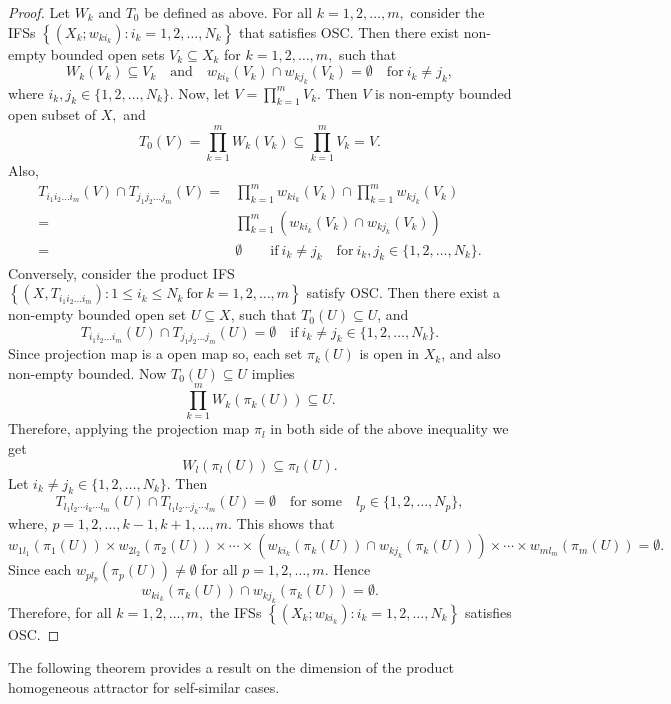 \documentclass[10pt]{amsart}
\theoremstyle{definition}
\begin{document}
	\begin{proof}
		Let $W_k$ and $T_0$  be defined as above. For all $k=1,2,\ldots,m,$ consider the IFSs $\left\{(X_k;w_{ki_k}):i_k=1,2,\ldots,N_k\right\}$ that satisfies OSC. Then there exist non-empty bounded open sets $V_k\subseteq X_k$ for $k=1,2,\ldots,m,$ such that $$W_k(V_k)\subseteq V_k\quad\mbox{and}\quad w_{ki_k}(V_k)\cap w_{kj_k}(V_k)=\emptyset\quad\mbox{for}~i_k\neq j_k,$$
		where $i_k,j_k\in\{1,2,\ldots,N_k\}.$ Now, let $V=\prod_{k=1}^{m}V_k.$ Then $V$ is non-empty bounded open subset of $X,$ and $$
		T_0(V)=\prod_{k=1}^mW_k(V_k)\subseteq\prod_{k=1}^mV_k=V.$$
		Also,
		\begin{align*}
			T_{i_1i_2\ldots i_m}(V)\cap T_{j_1j_2\ldots j_m}(V)=&\prod_{k=1}^mw_{ki_k}(V_k)\cap \prod_{k=1}^mw_{kj_k}(V_k)\\
			=&\prod_{k=1}^m\left(w_{ki_k}(V_k)\cap w_{kj_k}(V_k)\right)\\
			=&\emptyset \qquad \mbox{if}~i_k\neq j_k\quad\mbox{for}~i_k,j_k\in\{1,2,\ldots,N_k\}.
		\end{align*}
		Conversely, consider the product IFS $\left\{(X,T_{i_1i_2\ldots i_m}):1\leq i_k\leq N_k~\mbox{for}~k=1,2,\ldots,m\right\}$ satisfy OSC. Then there exist a non-empty bounded open set $U\subseteq X$, such that $T_0(U)\subseteq U$, and $$T_{i_1i_2\ldots i_m}(U)\cap T_{j_1j_2\ldots j_m}(U)=\emptyset\quad \mbox{if}~i_k\neq j_k\in\{1,2,\ldots,N_k\}. $$ Since projection map is a open map so, each set $\pi_k(U)$ is open in $X_k$, and also non-empty bounded. Now $T_0(U)\subseteq U$ implies
		$$\prod_{k=1}^mW_k(\pi_k(U))\subseteq U.$$
		Therefore, applying the projection map $\pi_l$ in both side of the above inequality we get
		$$W_l(\pi_l(U))\subseteq \pi_l(U).$$
		Let $i_k\neq j_k\in\{1,2,\ldots,N_k\}$. Then $$T_{l_1l_2\cdots i_k\cdots l_m}(U)\cap T_{l_1l_2\cdots j_k\cdots l_m}(U)=\emptyset\quad\mbox{for some}\quad l_p\in\{1,2,\ldots,N_p\},$$
		where, $p=1,2,\ldots,k-1,k+1,\ldots,m.$ This shows that $$w_{1l_1}(\pi_1(U))\times w_{2l_2}(\pi_2(U))\times\cdots\times (w_{ki_k}(\pi_k(U))\cap w_{kj_k}(\pi_k(U)))\times\cdots\times w_{ml_m}(\pi_m(U))=\emptyset.$$
		Since each $w_{pl_p}(\pi_p(U))\neq\emptyset$ for all $p=1,2,\ldots,m$. Hence $$w_{ki_k}(\pi_k(U))\cap w_{kj_k}(\pi_k(U))=\emptyset.$$ Therefore, for all $k=1,2,\ldots,m,$ the IFSs $\left\{(X_k;w_{ki_k}):i_k=1,2,\ldots,N_k\right\}$ satisfies OSC.
	\end{proof}
	The following theorem provides a result on the dimension of the product homogeneous attractor for self-similar cases.
	
\end{document}
